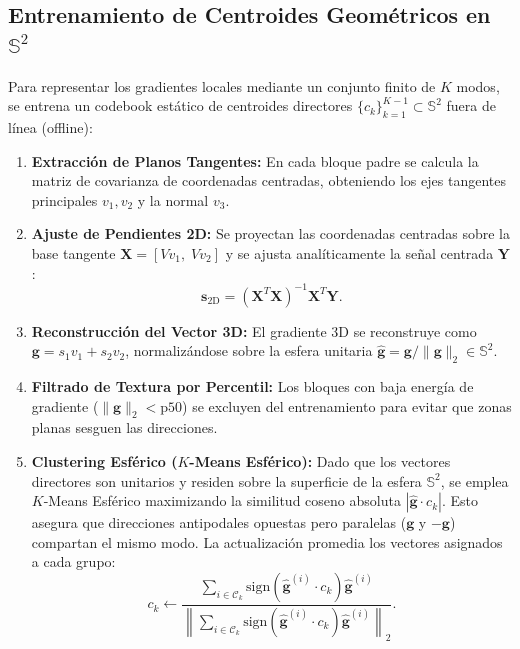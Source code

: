 \documentclass[11pt,a4paper]{article}
\begin{document}
\subsection{Entrenamiento de Centroides Geométricos en $\mathbb{S}^2$}
Para representar los gradientes locales mediante un conjunto finito de $K$ modos, se entrena un codebook estático de centroides directores $\{c_k\}_{k=1}^{K-1} \subset \mathbb{S}^2$ fuera de línea (offline):
\begin{enumerate}
  \item \textbf{Extracción de Planos Tangentes:} En cada bloque padre se calcula la matriz de covarianza de coordenadas centradas, obteniendo los ejes tangentes principales $v_1, v_2$ y la normal $v_3$.
  \item \textbf{Ajuste de Pendientes 2D:} Se proyectan las coordenadas centradas sobre la base tangente $\mathbf{X} = [V v_1, \; V v_2]$ y se ajusta analíticamente la señal centrada $\mathbf{Y}$:
  \begin{equation}
    \mathbf{s}_{\text{2D}} = (\mathbf{X}^T \mathbf{X})^{-1} \mathbf{X}^T \mathbf{Y}.
  \end{equation}
  \item \textbf{Reconstrucción del Vector 3D:} El gradiente 3D se reconstruye como $\mathbf{g} = s_1 v_1 + s_2 v_2$, normalizándose sobre la esfera unitaria $\hat{\mathbf{g}} = \mathbf{g} / \|\mathbf{g}\|_2 \in \mathbb{S}^2$.
  \item \textbf{Filtrado de Textura por Percentil:} Los bloques con baja energía de gradiente ($\|\mathbf{g}\|_2 < \text{p50}$) se excluyen del entrenamiento para evitar que zonas planas sesguen las direcciones.
  \item \textbf{Clustering Esférico ($K$-Means Esférico):} Dado que los vectores directores son unitarios y residen sobre la superficie de la esfera $\mathbb{S}^2$, se emplea $K$-Means Esférico maximizando la similitud coseno absoluta $|\hat{\mathbf{g}} \cdot c_k|$. Esto asegura que direcciones antipodales opuestas pero paralelas ($\mathbf{g}$ y $-\mathbf{g}$) compartan el mismo modo. La actualización promedia los vectores asignados a cada grupo:
  \begin{equation}
    c_k \leftarrow \frac{\sum_{i \in \mathcal{C}_k} \text{sign}(\hat{\mathbf{g}}^{(i)} \cdot c_k) \hat{\mathbf{g}}^{(i)}}{\left\|\sum_{i \in \mathcal{C}_k} \text{sign}(\hat{\mathbf{g}}^{(i)} \cdot c_k) \hat{\mathbf{g}}^{(i)}\right\|_2}.
  \end{equation}
\end{enumerate}
\end{document}
